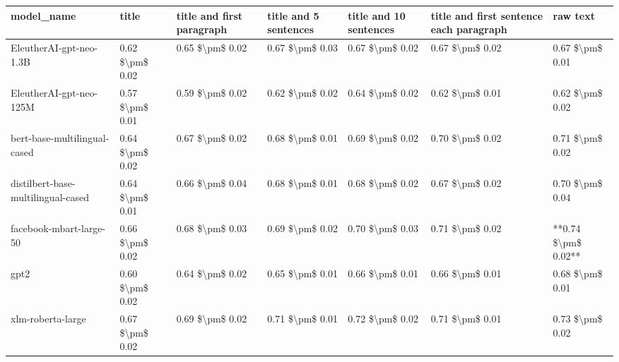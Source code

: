 \begin{tabular}{lllllll}
\toprule
                        model\_name &           title & title and first paragraph & title and 5 sentences & title and 10 sentences & title and first sentence each paragraph &            raw text \\
\midrule
           EleutherAI-gpt-neo-1.3B & 0.62 \$\textbackslash pm\$ 0.02 &           0.65 \$\textbackslash pm\$ 0.02 &       0.67 \$\textbackslash pm\$ 0.03 &        0.67 \$\textbackslash pm\$ 0.02 &                         0.67 \$\textbackslash pm\$ 0.02 &     0.67 \$\textbackslash pm\$ 0.01 \\
           EleutherAI-gpt-neo-125M & 0.57 \$\textbackslash pm\$ 0.01 &           0.59 \$\textbackslash pm\$ 0.02 &       0.62 \$\textbackslash pm\$ 0.02 &        0.64 \$\textbackslash pm\$ 0.02 &                         0.62 \$\textbackslash pm\$ 0.01 &     0.62 \$\textbackslash pm\$ 0.02 \\
      bert-base-multilingual-cased & 0.64 \$\textbackslash pm\$ 0.02 &           0.67 \$\textbackslash pm\$ 0.02 &       0.68 \$\textbackslash pm\$ 0.01 &        0.69 \$\textbackslash pm\$ 0.02 &                         0.70 \$\textbackslash pm\$ 0.02 &     0.71 \$\textbackslash pm\$ 0.02 \\
distilbert-base-multilingual-cased & 0.64 \$\textbackslash pm\$ 0.01 &           0.66 \$\textbackslash pm\$ 0.04 &       0.68 \$\textbackslash pm\$ 0.01 &        0.68 \$\textbackslash pm\$ 0.02 &                         0.67 \$\textbackslash pm\$ 0.02 &     0.70 \$\textbackslash pm\$ 0.04 \\
           facebook-mbart-large-50 & 0.66 \$\textbackslash pm\$ 0.02 &           0.68 \$\textbackslash pm\$ 0.03 &       0.69 \$\textbackslash pm\$ 0.02 &        0.70 \$\textbackslash pm\$ 0.03 &                         0.71 \$\textbackslash pm\$ 0.02 & **0.74 \$\textbackslash pm\$ 0.02** \\
                              gpt2 & 0.60 \$\textbackslash pm\$ 0.02 &           0.64 \$\textbackslash pm\$ 0.02 &       0.65 \$\textbackslash pm\$ 0.01 &        0.66 \$\textbackslash pm\$ 0.01 &                         0.66 \$\textbackslash pm\$ 0.01 &     0.68 \$\textbackslash pm\$ 0.01 \\
                 xlm-roberta-large & 0.67 \$\textbackslash pm\$ 0.02 &           0.69 \$\textbackslash pm\$ 0.02 &       0.71 \$\textbackslash pm\$ 0.01 &        0.72 \$\textbackslash pm\$ 0.02 &                         0.71 \$\textbackslash pm\$ 0.01 &     0.73 \$\textbackslash pm\$ 0.02 \\
\bottomrule
\end{tabular}
